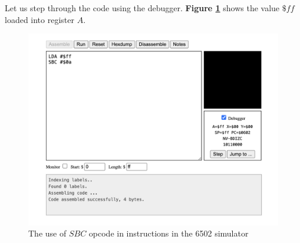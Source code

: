 \documentclass[a4paper]{article}
\begin{document}
Let us step through the code using the debugger. \textbf{Figure \ref{fig:24-ex3-step1}} shows the value $\$ff$ loaded into register $A$.

\begin{figure}[H]
    \centering
    \includegraphics[width=1.0\textwidth]{res/images/q2/24-ex3-step1.png}
    \caption{The use of $SBC$ opcode in instructions in the 6502 simulator}
    \label{fig:24-ex3-step1}
\end{figure}
\end{document}
